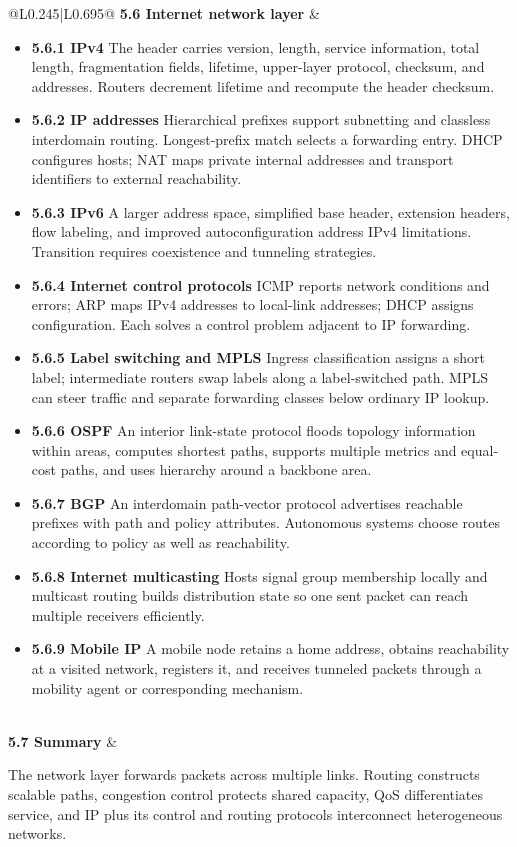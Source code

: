 \documentclass[10pt,letterpaper]{article}
\begin{document}
\begin{longtable}{@{}L{0.245\textwidth}|L{0.695\textwidth}@{}}
\textbf{5.6 Internet network layer} & \begin{minipage}[t]{\linewidth}\raggedright \begin{itemize}\item \textbf{5.6.1 IPv4} The header carries version, length, service information, total length, fragmentation fields, lifetime, upper-layer protocol, checksum, and addresses. Routers decrement lifetime and recompute the header checksum.\item \textbf{5.6.2 IP addresses} Hierarchical prefixes support subnetting and classless interdomain routing. Longest-prefix match selects a forwarding entry. DHCP configures hosts; NAT maps private internal addresses and transport identifiers to external reachability.\item \textbf{5.6.3 IPv6} A larger address space, simplified base header, extension headers, flow labeling, and improved autoconfiguration address IPv4 limitations. Transition requires coexistence and tunneling strategies.\item \textbf{5.6.4 Internet control protocols} ICMP reports network conditions and errors; ARP maps IPv4 addresses to local-link addresses; DHCP assigns configuration. Each solves a control problem adjacent to IP forwarding.\item \textbf{5.6.5 Label switching and MPLS} Ingress classification assigns a short label; intermediate routers swap labels along a label-switched path. MPLS can steer traffic and separate forwarding classes below ordinary IP lookup.\item \textbf{5.6.6 OSPF} An interior link-state protocol floods topology information within areas, computes shortest paths, supports multiple metrics and equal-cost paths, and uses hierarchy around a backbone area.\item \textbf{5.6.7 BGP} An interdomain path-vector protocol advertises reachable prefixes with path and policy attributes. Autonomous systems choose routes according to policy as well as reachability.\item \textbf{5.6.8 Internet multicasting} Hosts signal group membership locally and multicast routing builds distribution state so one sent packet can reach multiple receivers efficiently.\item \textbf{5.6.9 Mobile IP} A mobile node retains a home address, obtains reachability at a visited network, registers it, and receives tunneled packets through a mobility agent or corresponding mechanism.\end{itemize}\end{minipage} \\ \hline
{}\textbf{5.7 Summary} & \begin{minipage}[t]{\linewidth}\raggedright The network layer forwards packets across multiple links. Routing constructs scalable paths, congestion control protects shared capacity, QoS differentiates service, and IP plus its control and routing protocols interconnect heterogeneous networks.\end{minipage} \\ \hline
\end{longtable}
\end{document}
